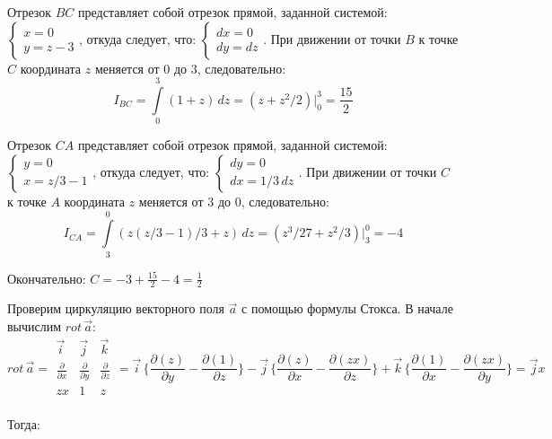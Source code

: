\documentclass[12pt]{article}
\begin{document}
	Отрезок $ BC $ представляет собой отрезок прямой, заданной системой:\\
	$\begin{cases}
		x = 0\\
		y = z - 3
	\end{cases}$, откуда следует, что:
	$\begin{cases}
		dx=0\\
		dy=dz
	\end{cases}$.  При движении от точки $ B $ к точке $ C $ координата $ z $ меняется от $ 0 $ до $ 3 $, следовательно:
	$$ I_{BC} = \int \limits_{0}^{3}  (1 + z) \, dz  = ( z + z^2/2)\Big|_{0}^{3} = \frac{15}{2}$$
		
	Отрезок $ CA $ представляет собой отрезок прямой, заданной системой:\\
	$\begin{cases}
		y = 0\\
		x = z/3 - 1
	\end{cases}$, откуда следует, что:
	$\begin{cases}
		dy = 0\\
		dx = 1/3 \, dz
	\end{cases}$.  При движении от точки $ C $ к точке $ A $ координата $ z $ меняется от $ 3 $ до $ 0 $, следовательно:
	$$ I_{CA} = \int \limits_{3}^{0}  (z( z/3 - 1)/3 + z) \, dz  = (z^3/27 + z^2/3) \Big|_{3}^{0} = - 4$$
		
	Окончательно: $ C = - 3 + \frac{15}{2} - 4  = \frac{1}{2} $

	Проверим циркуляцию векторного поля $ \vec{a} $ с помощью формулы Стокса. В начале вычислим $ rot \, \vec{a} $:
	\begin{equation*} 
		rot \, \vec{a} = 
		\begin{array}{|ccc|}
			\vec{i}						& \vec{j}	  					& \vec{k}						\\
			\frac{\partial}{\partial x}	& \frac{\partial}{\partial y}	& \frac{\partial}{\partial z} 	\\
			zx							& 1								& z							 	\\
		\end{array} 
		= \vec{i} \, \bigg\{ \frac{\partial (z)}{\partial y} - \frac{\partial (1)}{\partial z} \bigg\} - \vec{j} \, \bigg\{ \frac{\partial (z)}{\partial x} - \frac{\partial (zx)}{\partial z} \bigg\} + \vec{k} \, \bigg\{ \frac{\partial (1)}{\partial x} - \frac{\partial (zx)}{\partial y} \bigg\} = \vec{j} x 
	\end{equation*}

	Тогда:
\end{document}
